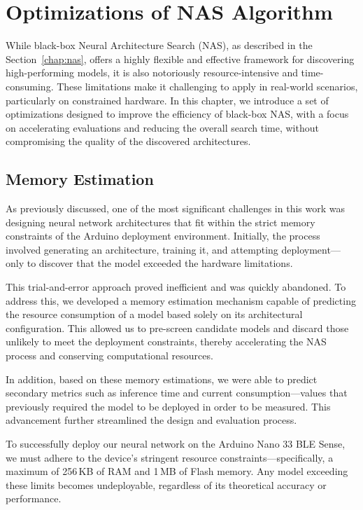 \chapter{Optimizations of NAS Algorithm}


\begin{sloppypar}
While black-box Neural Architecture Search (NAS), as described in the Section~\ref{chap:nas}, offers a highly flexible and effective framework for discovering high-performing models, it is also notoriously resource-intensive and time-consuming. These limitations make it challenging to apply in real-world scenarios, particularly on constrained hardware. In this chapter, we introduce a set of optimizations designed to improve the efficiency of black-box NAS, with a focus on accelerating evaluations and reducing the overall search time, without compromising the quality of the discovered architectures.
\end{sloppypar}

\section{Memory Estimation}

As previously discussed, one of the most significant challenges in this work was designing neural network architectures that fit within the strict memory constraints of the Arduino deployment environment. Initially, the process involved generating an architecture, training it, and attempting deployment—only to discover that the model exceeded the hardware limitations. 

This trial-and-error approach proved inefficient and was quickly abandoned. To address this, we developed a memory estimation mechanism capable of predicting the resource consumption of a model based solely on its architectural configuration. This allowed us to pre-screen candidate models and discard those unlikely to meet the deployment constraints, thereby accelerating the NAS process and conserving computational resources.

In addition, based on these memory estimations, we were able to predict secondary metrics such as inference time and current consumption—values that previously required the model to be deployed in order to be measured. This advancement further streamlined the design and evaluation process.


To successfully deploy our neural network on the Arduino Nano 33 BLE Sense, we must adhere to the device's stringent resource constraints—specifically, a maximum of 256\,KB of RAM and 1\,MB of Flash memory. Any model exceeding these limits becomes undeployable, regardless of its theoretical accuracy or performance.

